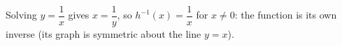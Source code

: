 Solving $y=\dfrac1x$ gives $x=\dfrac1y$, so $h^{-1}(x)=\boxed{\dfrac1x}$ for $x\ne0$: the function is its own inverse (its graph is symmetric about the line $y=x$).
